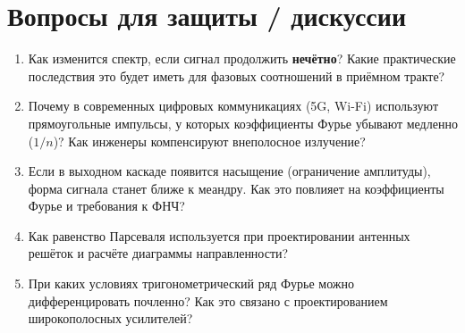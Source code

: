 \documentclass[a4paper,12pt]{article}
\begin{document}
\section{Вопросы для защиты / дискуссии}
\begin{enumerate}[label=\textbf{\alph*)}, leftmargin=*, itemsep=0.5em]
    \item Как изменится спектр, если сигнал продолжить \textbf{нечётно}? Какие практические последствия это будет иметь для фазовых соотношений в приёмном тракте?
    
    \item Почему в современных цифровых коммуникациях (5G, Wi-Fi) используют прямоугольные импульсы, у которых коэффициенты Фурье убывают медленно ($1/n$)? Как инженеры компенсируют внеполосное излучение?
    
    \item Если в выходном каскаде появится насыщение (ограничение амплитуды), форма сигнала станет ближе к меандру. Как это повлияет на коэффициенты Фурье и требования к ФНЧ?
    
    \item Как равенство Парсеваля используется при проектировании антенных решёток и расчёте диаграммы направленности?
    
    \item При каких условиях тригонометрический ряд Фурье можно дифференцировать почленно? Как это связано с проектированием широкополосных усилителей?
\end{enumerate}
\end{document}
